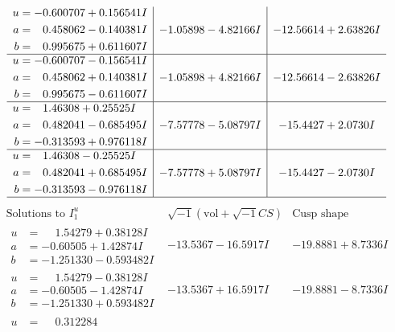 \documentclass[1p]{elsarticle_modified}
\theoremstyle{definition}
\newcommand{\I}{\sqrt{-1}}
\begin{document}
$$\begin{array}{c|c|c}
\begin{aligned}
u &= -0.600707 + 0.156541 I \\
a &= \phantom{-}0.458062 - 0.140381 I \\
b &= \phantom{-}0.995675 + 0.611607 I\end{aligned}
 & -1.05898 - 4.82166 I & -12.56614 + 2.63826 I \\ \hline\begin{aligned}
u &= -0.600707 - 0.156541 I \\
a &= \phantom{-}0.458062 + 0.140381 I \\
b &= \phantom{-}0.995675 - 0.611607 I\end{aligned}
 & -1.05898 + 4.82166 I & -12.56614 - 2.63826 I \\ \hline\begin{aligned}
u &= \phantom{-}1.46308 + 0.25525 I \\
a &= \phantom{-}0.482041 - 0.685495 I \\
b &= -0.313593 + 0.976118 I\end{aligned}
 & -7.57778 - 5.08797 I & -15.4427 + 2.0730 I \\ \hline\begin{aligned}
u &= \phantom{-}1.46308 - 0.25525 I \\
a &= \phantom{-}0.482041 + 0.685495 I \\
b &= -0.313593 - 0.976118 I\end{aligned}
 & -7.57778 + 5.08797 I & -15.4427 - 2.0730 I\\
 \hline 
 \end{array}$$\newpage$$\begin{array}{c|c|c}  
\text{Solutions to }I^u_{1}& \I (\text{vol} + \sqrt{-1}CS) & \text{Cusp shape}\\
 \hline 
\begin{aligned}
u &= \phantom{-}1.54279 + 0.38128 I \\
a &= -0.60505 + 1.42874 I \\
b &= -1.251330 - 0.593482 I\end{aligned}
 & -13.5367 - 16.5917 I & -19.8881 + 8.7336 I \\ \hline\begin{aligned}
u &= \phantom{-}1.54279 - 0.38128 I \\
a &= -0.60505 - 1.42874 I \\
b &= -1.251330 + 0.593482 I\end{aligned}
 & -13.5367 + 16.5917 I & -19.8881 - 8.7336 I \\ \hline\begin{aligned}
u &= \phantom{-}0.312284\phantom{ +0.000000I} \\

\end{aligned}
\end{array}$$
\end{document}
